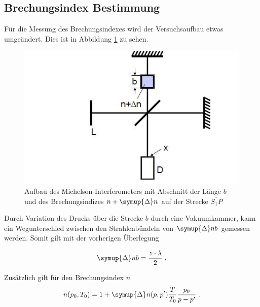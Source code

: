 \subsection{Brechungsindex Bestimmung}
Für die Messung des Brechungsindexes wird der Versuchsaufbau etwas umgeändert. Dies ist in Abbildung \ref{fig:2} zu sehen.

\begin{figure}
    \centering
    \includegraphics[scale = 0.7]{Picture/Pic2.JPG}
    \caption{Aufbau des Michelson-Interferometers mit Abschnitt der Länge $b$ und des
    Brechungsindizes $n + \symup{\Delta}n$ auf der Strecke $\overline{S_1 P}$ \cite{V401}}
    \label{fig:2}
  \end{figure}
\noindent
Durch Variation des Drucks über die Strecke $b$ durch eine Vakuumkammer, kann ein Wegunterschied zwischen den Strahlenbündeln von $\symup{\Delta}nb$ gemessen werden. Somit 
gilt mit der vorherigen Überlegung

\begin{equation*}
    \symup{\Delta}nb = \frac{z \cdot \lambda}{2} \; .
    \label{eqn:nb2}
  \end{equation*}

Zusätzlich gilt für den Brechungsindex $n$ 
\begin{equation*}
  n(p_0, T_0) = 1 + \symup{\Delta} n (p,p') \frac{T}{T_0} \frac{p_0}{p - p'} \; .
  \label{eqn:brech}
\end{equation*}

